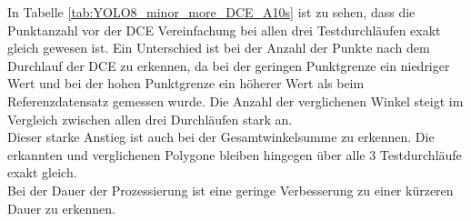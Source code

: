 {\begin{table}[ht]
		\end{table} In Tabelle \ref{tab:YOLO8_minor_more_DCE_A10s} ist zu sehen, dass die Punktanzahl vor der DCE Vereinfachung bei allen drei Testdurchläufen exakt gleich gewesen ist. Ein Unterschied ist bei der Anzahl der Punkte nach dem Durchlauf der DCE zu erkennen, da bei der geringen Punktgrenze ein niedriger Wert und bei der hohen Punktgrenze ein höherer Wert als beim Referenzdatensatz gemessen wurde. Die Anzahl der verglichenen Winkel steigt im Vergleich zwischen allen drei Durchläufen stark an. \\
		Dieser starke Anstieg ist auch bei der Gesamtwinkelsumme zu erkennen. Die erkannten und verglichenen Polygone bleiben hingegen über alle 3 Testdurchläufe exakt gleich. \\
		Bei der Dauer der Prozessierung ist eine geringe Verbesserung zu einer kürzeren Dauer zu erkennen.\\

		
	
}
